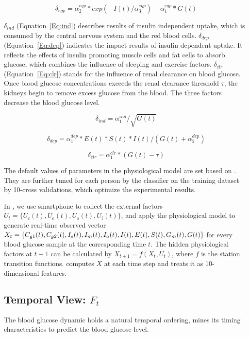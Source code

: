 \begin{equation}\label{Eq:egp}
  \delta_{egp}=\alpha_2^{egp}*exp(-I(t)/\alpha_3^{egp})-\alpha_1^{egp}*G(t)
\end{equation}

$\delta_{ind}$ (Equation~\ref{Eq:ind}) describes results of insulin independent uptake, which is consumed by the central nervous 
system and the red blood cells. 
$\delta_{dep}$ (Equation~\ref{Eq:dep}) indicates the impact results of insulin dependent uptake. It reflects the effects 
of insulin promoting muscle cells and fat cells to absorb glucose, which combines the influence of sleeping and exercise factors.
$\delta_{clr}$ (Equation~\ref{Eq:clr}) stands for the influence of renal clearance on blood glucose. Once blood glucose 
concentrations exceeds the renal clearance threshold $\tau$, the kidneys begin to remove excess glucose from the blood.
The three factors decrease the blood glucose level. 

\begin{equation}\label{Eq:ind}
  \delta_{ind}=\alpha_1^{ind}/\sqrt{G(t)}
\end{equation}

\begin{equation}\label{Eq:dep}
  \delta_{dep}=\alpha_1^{dep}* E(t)*S(t)*I(t)/(G(t)+\alpha_2^{dep})
\end{equation}

\begin{equation}\label{Eq:clr}
  \delta_{clr}=\alpha_1^{clr}*(G(t)-\tau)  
\end{equation}

The default values of parameters in the physiological model are set 
based on \cite{bib:duke2010intelligent}. They are further tuned for each person 
by the classifier on the training dataset by 10-cross validations, which optimize
the experimental results. 

In \sysname, we use smartphone to collect the external factors $U_t=\{U_c(t),U_e(t),U_s(t), U_i(t)\}$, and 
apply the physiological model to generate real-time observed vector 
$X_{t}=\{C_{g1}(t), C_{g2}(t),I_{s}(t),I_{m}(t), I_{a}(t), I(t),\\
 E(t), S(t),  G_{m}(t), G(t)\}$ for every blood glucose sample at the corresponding time $t$.  
The hidden physiological factors at $t+1$ can be calculated by
$X_{t+1}=f(X_t, U_t)$, where $f$ is the station transition functions.
\sysname computes $X$ at each time step and treats it as 10-dimensional
features.  

\subsection{Temporal View: $F_t$}
The blood glucose dynamic holds a natural temporal ordering, \sysname mines its timing characteristics 
to predict the blood glucose level.

